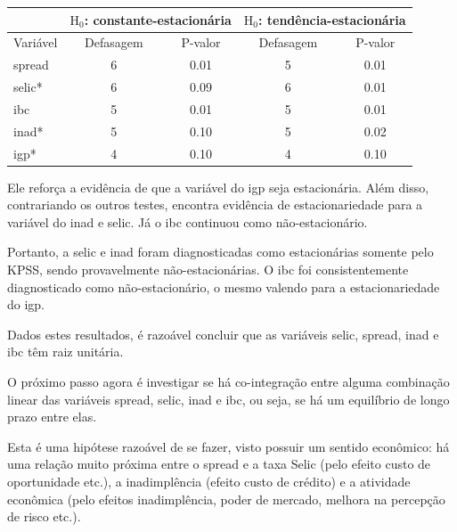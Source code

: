 \documentclass[a4paper,
               article,
               12pt,
               openany,
               oneside,
               english,
               brazil]{abntex2}
\numberwithin{equation}{section}
\begin{document}
    \begin{table}[ht]
        {%
            \begin{tabular}{lcccc}
                \midrule
                & \multicolumn{2}{C{5cm}}{$ \text{H}_0 $: constante-estacionária} & \multicolumn{2}{C{5cm}}{$ \text{H}_0 $: tendência-estacionária} \\
                \midrule
                Variável & Defasagem & P-valor & Defasagem & P-valor \\
                \midrule
                spread     &          6 &     0.01 &          5 &     0.01 \\
                selic*      &          6 &     0.09 &          6 &     0.01 \\
                ibc        &          5 &     0.01 &          5 &     0.01 \\
                inad*       &          5 &     0.10 &          5 &     0.02 \\
                igp*        &          4 &     0.10 &          4 &     0.10 \\
                \midrule
            \end{tabular}
            } 
            {}
    \end{table}

    Ele reforça a evidência de que a variável do igp seja estacionária. Além disso, contrariando os outros testes, encontra evidência de estacionariedade para a variável do inad e selic. Já o ibc continuou como não-estacionário.

    Portanto, a selic e inad foram diagnosticadas como estacionárias somente pelo KPSS\@, sendo provavelmente não-estacionárias. O ibc foi consistentemente diagnosticado como não-estacionário, o mesmo valendo para a estacionariedade do igp.

    Dados estes resultados, é razoável concluir que as variáveis selic, spread, inad e ibc têm raiz unitária. 
    
    O próximo passo agora é investigar se há co-integração entre alguma combinação linear das variáveis spread, selic, inad e ibc, ou seja, se há um equilíbrio de longo prazo entre elas.
    
    Esta é uma hipótese razoável de se fazer, visto possuir um sentido econômico: há uma relação muito próxima entre o spread e a taxa Selic (pelo efeito custo de oportunidade etc.), a inadimplência (efeito custo de crédito) e a atividade econômica (pelo efeitos inadimplência, poder de mercado, melhora na percepção de risco etc.).
\end{document}
